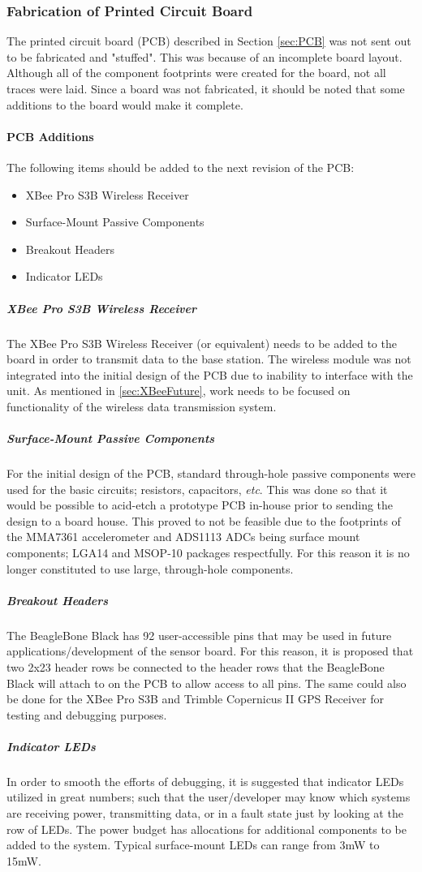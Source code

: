 \subsubsection{Fabrication of Printed Circuit Board}
The printed circuit board (PCB) described in Section \ref{sec:PCB} was not sent out to be fabricated and "stuffed".
This was because of an incomplete board layout.
Although all of the component footprints were created for the board, not all traces were laid.
Since a board was not fabricated, it should be noted that some additions to the board would make it complete.

\paragraph{PCB Additions}
The following items should be added to the next revision of the PCB:
\begin{itemize}
\item XBee Pro S3B Wireless Receiver
\item Surface-Mount Passive Components
\item Breakout Headers
\item Indicator LEDs
\end{itemize}

\subparagraph{XBee Pro S3B Wireless Receiver}
The XBee Pro S3B Wireless Receiver (or equivalent) needs to be added to the board in order to transmit data to the base station. 
The wireless module was not integrated into the initial design of the PCB due to inability to interface with the unit.
As mentioned in \ref{sec:XBeeFuture}, work needs to be focused on functionality of the wireless data transmission system.
\subparagraph{Surface-Mount Passive Components}
For the initial design of the PCB, standard through-hole passive components were used for the basic circuits; resistors, capacitors, \textit{etc}.
This was done so that it would be possible to acid-etch a prototype PCB in-house prior to sending the design to a board house.
This proved to not be feasible due to the footprints of the MMA7361 accelerometer and ADS1113 ADCs being surface mount components; LGA14 and MSOP-10 packages respectfully.
For this reason it is no longer constituted to use large, through-hole components.
\subparagraph{Breakout Headers}
The BeagleBone Black has 92 user-accessible pins that may be used in future applications/development of the sensor board.
For this reason, it is proposed that two 2x23 header rows be connected to the header rows that the BeagleBone Black will attach to on the PCB to allow access to all pins. 
The same could also be done for the XBee Pro S3B and Trimble Copernicus II GPS Receiver for testing and debugging purposes.
\subparagraph{Indicator LEDs}
In order to smooth the efforts of debugging, it is suggested that indicator LEDs utilized in great numbers; such that the user/developer may know which systems are receiving power, transmitting data, or in a fault state just by looking at the row of LEDs.
The power budget has allocations for additional components to be added to the system.
Typical surface-mount LEDs can range from  3mW to 15mW. 